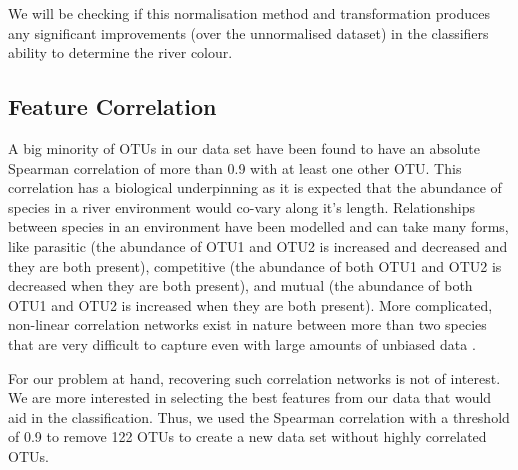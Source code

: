 We will be checking if this normalisation method and transformation produces any significant improvements (over the unnormalised dataset) in the classifiers ability to determine the river colour. 



\subsection{Feature Correlation}

A big minority of OTUs in our data set have been found to have an absolute Spearman correlation of more than 0.9 with at least one other OTU. This correlation has a biological underpinning as it is expected that the abundance of species in a river environment would co-vary along it's length. Relationships between species in an environment have been modelled and can take many forms, like parasitic (the abundance of OTU1 and OTU2 is increased and decreased and they are both present), competitive (the abundance of both OTU1 and OTU2 is decreased when they are both present), and mutual (the abundance of both OTU1 and OTU2 is increased when they are both present). More complicated, non-linear correlation networks exist in nature between more than two species that are very difficult to capture even with large amounts of unbiased data \cite{weiss_correlation_2016}. 



For our problem at hand, recovering such correlation networks is not of interest. We are more interested in selecting the best features from our data that would aid in the classification. Thus, we used the Spearman correlation with a threshold of 0.9 to remove 122 OTUs to create a new data set without highly correlated OTUs. 











